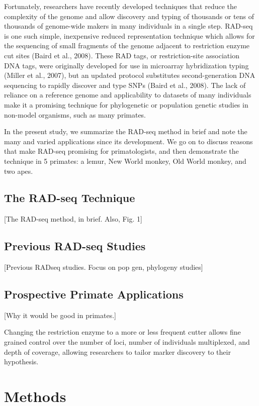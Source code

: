 \documentclass[12pt]{article}
\begin{document}
Fortunately, researchers have recently developed techniques that reduce the complexity of the genome and allow discovery and typing of thousands or tens of thousands of genome-wide makers in many individuals in a single step. RAD-seq is one such simple, inexpensive reduced representation technique which allows for the sequencing of small fragments of the genome adjacent to restriction enzyme cut sites (Baird et al., 2008). These RAD tags, or restriction-site association DNA tags, were originally developed for use in microarray hybridization typing (Miller et al., 2007), but an updated protocol substitutes second-generation DNA sequencing to rapidly discover and type SNPs (Baird et al., 2008). The lack of reliance on a reference genome and applicability to datasets of many individuals make it a promising technique for phylogenetic or population genetic studies in non-model organisms, such as many primates.

In the present study, we summarize the RAD-seq method in brief and note the many and varied applications since its development. We go on to discuss reasons that make RAD-seq promising for primatologists, and then demonstrate the technique in 5 primates: a lemur, New World monkey, Old World monkey, and two apes.  

\subsection{The RAD-seq Technique}

[The RAD-seq method, in brief. Also, Fig. 1]

\subsection{Previous RAD-seq Studies}

[Previous RADseq studies. Focus on pop gen, phylogeny studies]

\subsection{Prospective Primate Applications}

[Why it would be good in primates.]

Changing the restriction enzyme to a more or less frequent cutter allows fine grained control over the number of loci, number of individuals multiplexed, and depth of coverage, allowing researchers to tailor marker discovery to their hypothesis. 

\section{Methods}
\end{document}
